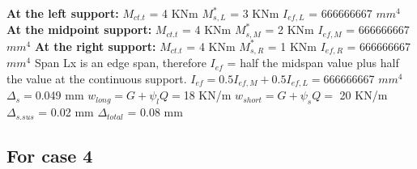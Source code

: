 \documentclass{article}%
\begin{document}
%
\newline%
\newline%
%
\textbf{At the left support:}%
\newline%
\newline%
%
$M_{ct.t}$ = 4 KNm%
\newline%
%
$M_{s,L}^{*}$ = 3 KNm%
\newline%
%
$I_{ef,L}$ = 666666667 $mm^{4}$%
\newline%
\newline%
%
\textbf{At the midpoint support:}%
\newline%
\newline%
%
$M_{ct.t}$ = 4 KNm%
\newline%
%
$M_{s,M}^{*}$ = 2 KNm%
\newline%
%
$I_{ef,M}$ = 666666667 $mm^{4}$%
\newline%
\newline%
%
\textbf{At the right support:}%
\newline%
\newline%
%
$M_{ct.t}$ = 4 KNm%
\newline%
%
$M_{s,R}^{*}$ = 1 KNm%
\newline%
%
$I_{ef,R}$ = 666666667 $mm^{4}$%
\newline%
\newline%
%
Span Lx is an edge span, therefore $I_{ef}$ = half the midspan value plus half the value at the continuous support.%
\newline%
\newline%
%
$I_{ef} = 0.5I_{ef,M} + 0.5I_{ef,L} = $666666667 $ mm^{4}$%
\newline%
\newline%
%
$\Delta_{s} =$0.049 mm%
\newline%
\newline%
%
$w_{long} = G + \psi_{l}Q = $18 KN/m%
\newline%
%
$w_{short} = G + \psi_{s}Q = $ 20 KN/m%
\newline%
\newline%
%
$\Delta_{s.sus}$ = 0.02 mm%
\newline%
\newline%
%
$\Delta_{total}$ = 0.08 mm%
\subsection*{For case 4}%
\label{subsec:Forcase4}%
\end{document}
